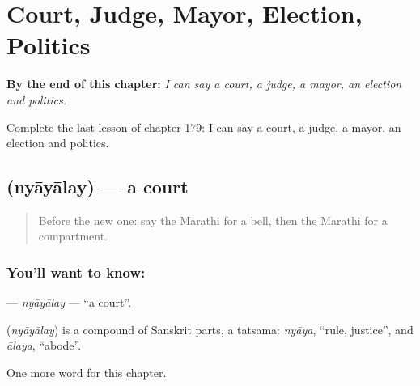 
\chapter{Court, Judge, Mayor, Election, Politics}
\label{ch:mr-court-judge-mayor-election-politics}

\begin{chapteropening}
\textbf{By the end of this chapter:} \emph{I can say a court, a judge, a mayor, an election and politics.}

Complete the last lesson of chapter 179: I can say a court, a judge, a mayor, an election and politics.
\end{chapteropening}

\section[\texorpdfstring{\mr{न्यायालय} (nyāyālay)}{न्यायालय (nyāyālay)}]{ (nyāyālay) — a court}

\label{lesson:MR-C179-nyayalay}



\begin{quote}
Before the new one: say the Marathi for a bell, then the Marathi for a compartment.
\end{quote}

\subsection*{You'll want to know: }
\textbf{} — \emph{nyāyālay} — \textquotedblleft{}a court\textquotedblright{}.

\begin{cousinweb}
\textbf{} (\emph{nyāyālay}) is a compound of Sanskrit parts, a tatsama: \emph{nyāya}, \textquotedblleft{}rule, justice\textquotedblright{}, and \emph{ālaya}, \textquotedblleft{}abode\textquotedblright{}.
\end{cousinweb}

\begin{grammarlens}[title={What you've built}]
One more word for this chapter.
\end{grammarlens}


